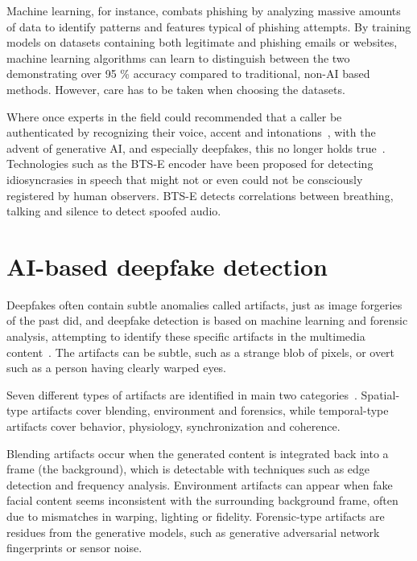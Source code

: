 Machine learning, for instance, combats phishing by analyzing massive amounts of data to identify patterns and features typical of phishing attempts. By training models on datasets containing both legitimate and phishing emails or websites, machine learning algorithms can learn to distinguish between the two demonstrating over 95 \% accuracy compared to traditional, non-AI based methods. However, care has to be taken when choosing the datasets.


Where once experts in the field could recommended that a caller be authenticated by recognizing their voice, accent and intonations~\citep{mitnick_The_Art_of_Deception_2003}, with the advent of generative AI, and especially deepfakes, this no longer holds true~\citep{doan_BTSE_Audio_Deepfake_Detection_2023}. Technologies such as the BTS-E encoder have been proposed for detecting idiosyncrasies in speech that might not or even could not be consciously registered by human observers. BTS-E detects correlations between breathing, talking and silence to detect spoofed audio.

\section{AI-based deepfake detection}
\begin{comment}
  -
\end{comment}

Deepfakes often contain subtle anomalies called artifacts, just as image forgeries of the past did, and deepfake detection is based on machine learning and forensic analysis, attempting to identify these specific artifacts in the multimedia content~\citep{mirsky_Creation_Detection_Deepfakes_2021}. The artifacts can be subtle, such as a strange blob of pixels, or overt such as a person having clearly warped eyes.

Seven different types of artifacts are identified in main two categories~\citep{mirsky_Creation_Detection_Deepfakes_2021}. Spatial-type artifacts cover blending, environment and forensics, while temporal-type artifacts cover behavior, physiology, synchronization and coherence.

Blending artifacts occur when the generated content is integrated back into a frame (the background), which is detectable with techniques such as edge detection and frequency analysis. Environment artifacts can appear when fake facial content seems inconsistent with the surrounding background frame, often due to mismatches in warping, lighting or fidelity. Forensic-type artifacts are residues from the generative models, such as generative adversarial network fingerprints or sensor noise.

